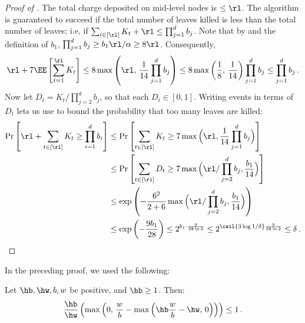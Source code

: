 \begin{itemize}
\begin{itemize}
\begin{proof}[Proof of ]
  The total charge deposited on mid-level nodes is $\le \rl$. The algorithm is guaranteed to succeed if the total number of leaves killed is less than the total number of leaves; i.e, if $\sum_{i \in [\rl]} K_t + \rl \le \prod_{j=1}^{d} b_j$. Note that by  and the definition of $b_1$, $\prod_{j=1}^{d} b_j \ge b_1 \rl / \alpha \ge 8 \rl$. Consequently,
  \begin{align*}
    \rl + 7 \EE\left[\sum_{t = 1}^{\rl} K_t\right] 
    \le 8 \max\left(\rl,\, \frac{1}{14} \prod_{j=1}^{d} b_j\right)
    \le 8 \max\left(\frac{1}{8},\, \frac{1}{14}\right) \prod_{j=1}^{d} b_j \le  \prod_{j=1}^{d} b_j \,.
  \end{align*}
  Now let $D_t = K_t / \prod_{j=2}^{d} b_j$, so that each $D_t \in [0,1]$. Writing events in terms of $D_t$ lets us use  to bound the probability that too many leaves are killed:
  \begin{align*}
  \Pr\left[\rl + \sum_{t \in [\rl]} K_t \ge \prod_{i=1}^{d} b_i\right] &\le 
      \Pr\left[\sum_{t \in [\rl]} K_t \ge 7 \max\Big(\rl, \frac{1}{14} \prod_{j=1}^{d} b_j\Big) \right] \\
      &\le \Pr\left[\sum_{t \in [\rl]} D_t \ge 7 \max\Big(\rl / \prod_{j=2}^{d} b_j, \frac{b_1}{14} \Big) \right] \\
      &\le \exp\left( - \frac{6^2}{2+6} \max\Big(\rl / \prod_{j=2}^{d} b_j, \frac{b_1}{14} \Big) \right) \\
      &\le \exp\left( - \frac{9 b_1}{28} \right) \le 2^{b_1 \cdot \frac{9}{28 \ln 2}} \le 2^{\ceil{3 \log 1/\delta} \frac{9}{28 \ln 2}} \le \delta \,. \qedhere
  \end{align*}  
\end{proof}

In the preceding proof, we used the following:

\begin{lemma}\label{lem:charge-adjusted-gain}
  Let $\hb,\hw,b,w$ be positive, and $\hb \ge 1$. Then:
  \begin{align*}
    \frac{\hb}{\hw} \left( \max\left(0,\, \frac{w}{b} - \max\left(\hb \frac{w}{b} - \hw,\, 0\right) \right)\right) \le 1 \,.
  \end{align*}
\end{lemma}


\end{itemize}
\end{itemize}
